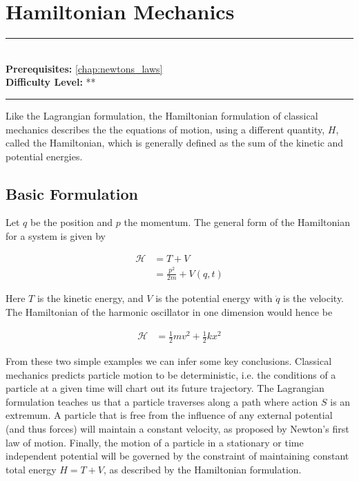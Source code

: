 \documentclass[book.tex]{subfiles}
\begin{document}
\chapter{Hamiltonian Mechanics}
\label{chap:hamiltonians_mechanics}
\noindent\rule{11cm}{0.4pt} \\
\textbf{Prerequisites:} \autoref{chap:newtons_laws} \\
\textbf{Difficulty Level:} ** \\
\noindent\rule{11cm}{0.4pt}
\vspace{5mm}

Like the Lagrangian formulation, the Hamiltonian formulation of classical mechanics describes the the equations of motion, using a different quantity, $H$, called the Hamiltonian, which is generally defined as the sum of the kinetic and potential energies. 

\section{Basic Formulation}
Let $q$ be the position and $p$ the momentum. The general form of the Hamiltonian for a system is given by

\begin{align}\label{hamiltonian}
\mathcal{H} &= T+V\\
&= \frac{p^2}{2m} + V(q,t)
\end{align}

Here $T$ is the kinetic energy, and $V$ is the potential energy with $\dot{q}$ is the velocity. The Hamiltonian of the harmonic oscillator in one dimension would hence be
  
\begin{align}\label{soln2c}
\mathcal{H} &= \frac{1}{2}mv^2 + \frac{1}{2}kx^2 
\end{align}



From these two simple examples we can infer some key conclusions. Classical mechanics predicts particle motion to be deterministic, i.e. the conditions of a particle at a given time will chart out its future trajectory. The Lagrangian formulation teaches us that a particle traverses along a path where action $S$ is an extremum. A particle that is free from the influence of any external potential (and thus forces) will maintain a constant velocity, as proposed by Newton's first law of motion. Finally, the motion of a particle in a stationary or time independent potential will be governed by the constraint of maintaining constant total energy $H = T + V$, as described by the Hamiltonian formulation. 
\end{document}
